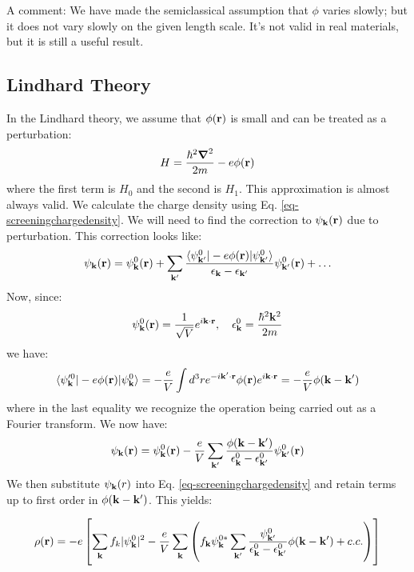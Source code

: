 A comment: We have made the semiclassical assumption that $\phi$ varies slowly; but it does not vary slowly on the given length scale. It's not valid in real materials, but it is still a useful result. 

\subsection{Lindhard Theory}
In the Lindhard theory, we assume that $\phi(\mathbf{r})$ is small and can be treated as a perturbation:
\begin{equation}
    H = \frac{\hbar^2 \nabla^2}{2m} - e\phi(\v{r})
\end{equation}
where the first term is $H_0$ and the second is $H_1$. This approximation is almost always valid. We calculate the charge density using Eq. \eqref{eq-screeningchargedensity}. We will need to find the correction to $\psi_{\mathbf{k}}(\mathbf{r})$ due to perturbation. This correction looks like:
\begin{equation}
    \psi_{\mathbf{k}}(\mathbf{r}) = \psi_{\mathbf{k}}^0(\mathbf{r}) + \sum_{\mathbf{k}'}\frac{\langle \psi^0_{\mathbf{k}'} \rvert-e\phi(\mathbf{r})\lvert \psi^0_{\mathbf{k}'} \rangle}{\epsilon_{\mathbf{k}} - \epsilon_{\mathbf{k}'}}\psi_{\mathbf{k}'}^0(\mathbf{r}) + \ldots
\end{equation}
Now, since:
\begin{align*}
    \psi_{\mathbf{k}}^0(\mathbf{r}) = \frac{1}{\sqrt{V}}e^{i\mathbf{k} \cdot \mathbf{r}}, \quad \epsilon^0_{\mathbf{k}} = \frac{\hbar^2\mathbf{k}^2}{2m}
\end{align*}
we have:
\begin{equation}
    \langle \psi_{\mathbf{k}}'^0 \rvert-e\phi(\mathbf{r})\lvert \psi_{\mathbf{k}}^0 \rangle = -\frac{e}{V}\int d^3r e^{-i\mathbf{k}' \cdot \mathbf{r}} \phi(\mathbf{r})e^{i\mathbf{k} \cdot \mathbf{r}} = -\frac{e}{V}\phi(\mathbf{k} - \mathbf{k}')
\end{equation}
where in the last equality we recognize the operation being carried out as a Fourier transform. We now have:
\begin{equation}
    \psi_{\mathbf{k}}(\mathbf{r}) = \psi_{\mathbf{k}}^0(\mathbf{r}) - \frac{e}{V}\sum_{\mathbf{k}'}\frac{\phi(\mathbf{k} - \mathbf{k'})}{\epsilon^0_{\mathbf{k}} - \epsilon^0_{\mathbf{k}'}}\psi^0_{\mathbf{k}'}(\mathbf{r})
\end{equation}
We then substitute $\psi_{\mathbf{k}}(r)$ into Eq. \eqref{eq-screeningchargedensity} and retain terms up to first order in $\phi(\mathbf{k} - \mathbf{k}')$. This yields:

\begin{equation}
    \rho(\mathbf{r}) = -e\left[\sum_{\mathbf{k}}f_k\lvert \psi_{\mathbf{k}}^0 \rvert^2 - \frac{e}{V}\sum_{\mathbf{k}}\left(f_{\mathbf{k}}\psi_{\mathbf{k}}^{0*}\sum_{\mathbf{k}'} \frac{\psi^0_{\mathbf{k}'}}{\epsilon^0_{\mathbf{k}} - \epsilon^0_{\mathbf{k}'}}\phi(\mathbf{k} - \mathbf{k}') + c.c.\right)\right]
\end{equation}

